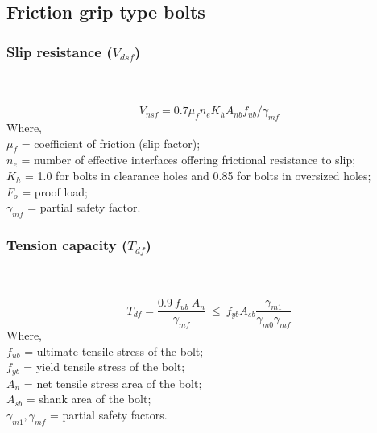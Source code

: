 \documentclass[11.5pt,a4paper,oneside]{report}
\begin{document}
\begin{Form}
\subsection{Friction grip type bolts}
\subsubsection{Slip resistance (\boldmath $V_{dsf}$)}
\qquad \qquad [Reference: Cl. 10.4.3, IS 800:2007] \\ \\
\begin{equation}
	V_{nsf} = 0.7 \mu_f n_e  K_h A_{nb} f_{ub} / \gamma_{mf}
\end{equation}
Where, \\
\indent $\mu_f$ = coefficient of friction (slip factor); \\
\indent $n_e$ = number of effective interfaces offering frictional resistance to slip; \\
\indent $K_h$ = 1.0 for bolts in clearance holes and 0.85 for bolts in oversized holes; \\
\indent $F_o$ = proof load; \\
\indent $\gamma_{mf}$ = partial safety factor.
\subsubsection{Tension capacity (\boldmath $T_{df}$)}
\label{tension_friction}
\qquad \qquad [Reference: Cl. 10.4.5, IS 800:2007] \\ \\
\begin{equation}
T_{df} = \frac{0.9~ f_{ub}~ A_n}{\gamma_{mf}} ~\leq~ f_{yb} A_{sb}  \frac{\gamma_{m1}}{\gamma_{m0} \gamma_{mf}}
\end{equation}
Where, \\
\indent $f_{ub}$ = ultimate tensile stress of the bolt; \\
\indent $f_{yb}$ = yield tensile stress of the bolt; \\
\indent $A_n$ = net tensile stress area of the bolt; \\
\indent $A_{sb}$ = shank area of the bolt; \\
\indent $\gamma_{m1}, \gamma_{mf}$ = partial safety factors. \\


\end{Form}
\end{document}
